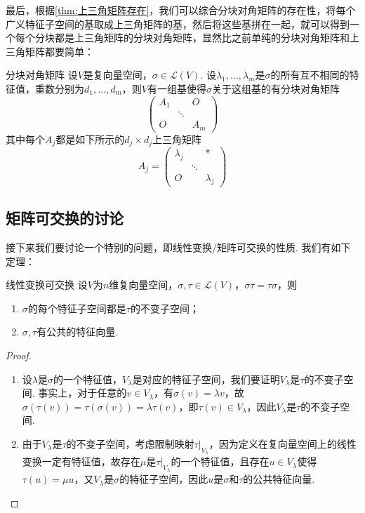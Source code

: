 最后，根据\autoref{thm:上三角矩阵存在}，我们可以综合分块对角矩阵的存在性，将每个广义特征子空间的基取成上三角矩阵的基，然后将这些基拼在一起，就可以得到一个每个分块都是上三角矩阵的分块对角矩阵，显然比之前单纯的分块对角矩阵和上三角矩阵都要简单：
\begin{theorem}{}{分块对角矩阵}
    设$V$是复向量空间，$\sigma\in \mathcal{L}(V)$. 设$\lambda_1,\ldots,\lambda_m$是$\sigma$的所有互不相同的特征值，重数分别为$d_1,\ldots,d_m$，则$V$有一组基使得$\sigma$关于这组基的有分块对角矩阵
    \[\begin{pmatrix}
            A_1 &  & O \\  & \ddots &  \\ O &  & A_m
        \end{pmatrix}\]
    其中每个$A_j$都是如下所示的$d_j\times d_j$上三角矩阵
    \[A_j=\begin{pmatrix}
            \lambda_j &  & * \\  & \ddots &  \\ O &  & \lambda_j
        \end{pmatrix}\]
\end{theorem}

\subsection{矩阵可交换的讨论}
接下来我们要讨论一个特别的问题，即线性变换/矩阵可交换的性质. 我们有如下定理：
\begin{theorem}{}{线性变换可交换}
    设$V$为$n$维复向量空间，$\sigma,\tau\in \mathcal{L}(V)$，$\sigma\tau=\tau\sigma$，则
    \begin{enumerate}
        \item $\sigma$的每个特征子空间都是$\tau$的不变子空间；

        \item $\sigma,\tau$有公共的特征向量.
    \end{enumerate}
\end{theorem}
\begin{proof}
    \begin{enumerate}
        \item 设$\lambda$是$\sigma$的一个特征值，$V_\lambda$是对应的特征子空间，我们要证明$V_\lambda$是$\tau$的不变子空间. 事实上，对于任意的$v\in V_\lambda$，有$\sigma(v)=\lambda v$，故$\sigma(\tau(v))=\tau(\sigma(v))=\lambda\tau(v)$，即$\tau(v)\in V_\lambda$，因此$V_\lambda$是$\tau$的不变子空间.

        \item 由于$V_\lambda$是$\tau$的不变子空间，考虑限制映射$\tau\vert_{V_\lambda}$，因为定义在复向量空间上的线性变换一定有特征值，故存在$\mu$是$\tau\vert_{V_\lambda}$的一个特征值，且存在$u\in V_\lambda$使得$\tau(u)=\mu u$，又$V_\lambda$是$\sigma$的特征子空间，因此$u$是$\sigma$和$\tau$的公共特征向量.
    \end{enumerate}
\end{proof}

